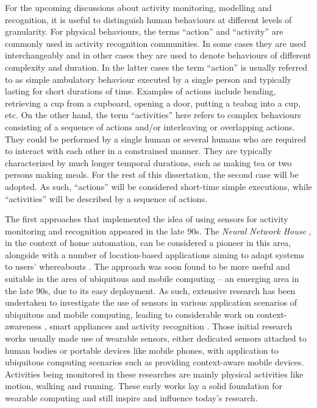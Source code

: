 For the upcoming discussions about activity monitoring, modelling and recognition, it is useful to distinguish human behaviours at different levels of granularity. For physical behaviours, the terms “action” and “activity” are commonly used in activity recognition communities. In some cases they are used interchangeably and in other cases they are used to denote behaviours of different complexity and duration. In the latter cases the term “action” is usually referred to as simple ambulatory behaviour executed by a single person and typically lasting for short durations of time. Examples of actions include bending, retrieving a cup from a cupboard, opening a door, putting a teabag into a cup, etc. On the other hand, the term “activities” here refers to complex behaviours consisting of a sequence of actions and/or interleaving or overlapping actions. They could be performed by a single human or several humans who are required to interact with each other in a constrained manner. They are typically characterized by much longer temporal durations, such as making tea or two persons making meals. For the rest of this dissertation, the second case will be adopted. As such, ``actions'' will be considered short-time simple executions, while ``activities'' will be described by a sequence of actions.

The first approaches that implemented the idea of using sensors for activity monitoring and recognition appeared in the late 90s. The \textit{Neural Network House} \cite{Mozer1998}, in the context of home automation, can be considered a pioneer in this area, alongside with a number of location-based applications aiming to adapt systems to users’ whereabouts \cite{Leonhardt1998} \cite{Golding1999} \cite{Ward1997}. The approach was soon found to be more useful and suitable in the area of ubiquitous and mobile computing – an emerging area in the late 90s, due to its easy deployment. As such, extensive research has been undertaken to investigate the use of sensors in various application scenarios of ubiquitous and mobile computing, leading to considerable work on context-awareness \cite{Schmidt1999} \cite{Randell2000} \cite{Gellersen2002}, smart appliances \cite{Schmidt2001} \cite{Laerhoven2001} and activity recognition \cite{Laerhoven2001a} \cite{Foerster2000} \cite{Lee2002}. Those initial research works usually made use of wearable sensors, either dedicated sensors attached to human bodies or portable devices like mobile phones, with application to ubiquitous computing scenarios such as providing context-aware mobile devices. Activities being monitored in these researches are mainly physical activities like motion, walking and running. These early works lay a solid foundation for wearable computing and still inspire and influence today’s research.

